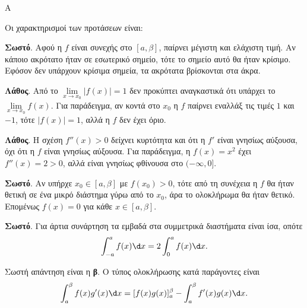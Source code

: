 \begin{thema}{Α}
\begin{erwthma}
\item {}

\item {}

\item {}

\item Οι χαρακτηρισμοί των προτάσεων είναι:
\begin{alist}
\item \textbf{Σωστό}. Αφού η $f$ είναι συνεχής στο $[a,\beta]$, παίρνει μέγιστη και ελάχιστη τιμή. Αν κάποιο ακρότατο ήταν σε εσωτερικό σημείο, τότε το σημείο αυτό θα ήταν κρίσιμο. Εφόσον δεν υπάρχουν κρίσιμα σημεία, τα ακρότατα βρίσκονται στα άκρα.
\item \textbf{Λάθος}. Από το $\lim\limits_{x\to x_0}|f(x)|=1$ δεν προκύπτει αναγκαστικά ότι υπάρχει το $\lim\limits_{x\to x_0}f(x)$. Για παράδειγμα, αν κοντά στο $x_0$ η $f$ παίρνει εναλλάξ τις τιμές $1$ και $-1$, τότε $|f(x)|=1$, αλλά η $f$ δεν έχει όριο.
\item \textbf{Λάθος}. Η σχέση $f''(x)>0$ δείχνει κυρτότητα και ότι η $f'$ είναι γνησίως αύξουσα, όχι ότι η $f$ είναι γνησίως αύξουσα. Για παράδειγμα, η $f(x)=x^2$ έχει $f''(x)=2>0$, αλλά είναι γνησίως φθίνουσα στο $(-\infty,0]$.
\item \textbf{Σωστό}. Αν υπήρχε $x_0\in[a,\beta]$ με $f(x_0)>0$, τότε από τη συνέχεια η $f$ θα ήταν θετική σε ένα μικρό διάστημα γύρω από το $x_0$, άρα το ολοκλήρωμα θα ήταν θετικό. Επομένως $f(x)=0$ για κάθε $x\in[a,\beta]$.
\item \textbf{Σωστό}. Για άρτια συνάρτηση τα εμβαδά στα συμμετρικά διαστήματα είναι ίσα, οπότε
\[ \dint_{-a}^{a}f(x)\d x=2\dint_0^a f(x)\d x. \]
\end{alist}

\item Σωστή απάντηση είναι η \textbf{β}. Ο τύπος ολοκλήρωσης κατά παράγοντες είναι
\[ \dint_a^\beta f(x)g'(x)\d x=[f(x)g(x)]_a^\beta-\dint_a^\beta f'(x)g(x)\d x. \]
\end{erwthma}
\end{thema}

